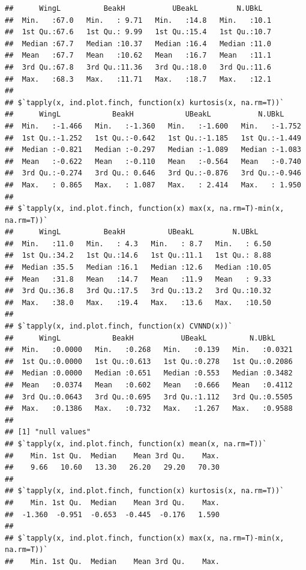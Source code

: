 \documentclass[12pt]{article}\usepackage[]{graphicx}\usepackage[]{color}
\makeatletter
\newenvironment{kframe}{%
 \def\at@end@of@kframe{}%
 \ifinner\ifhmode%
  \def\at@end@of@kframe{\end{minipage}}%
  \begin{minipage}{\columnwidth}%
 \fi\fi%
 \def\FrameCommand##1{\hskip\@totalleftmargin \hskip-\fboxsep
 \colorbox{shadecolor}{##1}\hskip-\fboxsep
     \hskip-\linewidth \hskip-\@totalleftmargin \hskip\columnwidth}%
 \MakeFramed {\advance\hsize-\width
   \@totalleftmargin\z@ \linewidth\hsize
   \@setminipage}}%
 {\par\unskip\endMakeFramed%
 \at@end@of@kframe}
\newenvironment{knitrout}{}{} %
\makeatother
\begin{document}
\begin{knitrout}
\begin{kframe}
\begin{verbatim}
##      WingL          BeakH           UBeakL         N.UBkL    
##  Min.   :67.0   Min.   : 9.71   Min.   :14.8   Min.   :10.1  
##  1st Qu.:67.6   1st Qu.: 9.99   1st Qu.:15.4   1st Qu.:10.7  
##  Median :67.7   Median :10.37   Median :16.4   Median :11.0  
##  Mean   :67.7   Mean   :10.62   Mean   :16.7   Mean   :11.1  
##  3rd Qu.:67.8   3rd Qu.:11.36   3rd Qu.:18.0   3rd Qu.:11.6  
##  Max.   :68.3   Max.   :11.71   Max.   :18.7   Max.   :12.1  
## 
## $`tapply(x, ind.plot.finch, function(x) kurtosis(x, na.rm=T))`
##      WingL            BeakH            UBeakL           N.UBkL      
##  Min.   :-1.466   Min.   :-1.360   Min.   :-1.600   Min.   :-1.752  
##  1st Qu.:-1.252   1st Qu.:-0.642   1st Qu.:-1.185   1st Qu.:-1.449  
##  Median :-0.821   Median :-0.297   Median :-1.089   Median :-1.083  
##  Mean   :-0.622   Mean   :-0.110   Mean   :-0.564   Mean   :-0.740  
##  3rd Qu.:-0.274   3rd Qu.: 0.646   3rd Qu.:-0.876   3rd Qu.:-0.946  
##  Max.   : 0.865   Max.   : 1.087   Max.   : 2.414   Max.   : 1.950  
## 
## $`tapply(x, ind.plot.finch, function(x) max(x, na.rm=T)-min(x, na.rm=T))`
##      WingL          BeakH          UBeakL         N.UBkL     
##  Min.   :11.0   Min.   : 4.3   Min.   : 8.7   Min.   : 6.50  
##  1st Qu.:34.2   1st Qu.:14.6   1st Qu.:11.1   1st Qu.: 8.88  
##  Median :35.5   Median :16.1   Median :12.6   Median :10.05  
##  Mean   :31.8   Mean   :14.7   Mean   :11.9   Mean   : 9.33  
##  3rd Qu.:36.8   3rd Qu.:17.5   3rd Qu.:13.2   3rd Qu.:10.32  
##  Max.   :38.0   Max.   :19.4   Max.   :13.6   Max.   :10.50  
## 
## $`tapply(x, ind.plot.finch, function(x) CVNND(x))`
##      WingL            BeakH           UBeakL          N.UBkL      
##  Min.   :0.0000   Min.   :0.268   Min.   :0.139   Min.   :0.0321  
##  1st Qu.:0.0000   1st Qu.:0.613   1st Qu.:0.278   1st Qu.:0.2086  
##  Median :0.0000   Median :0.651   Median :0.553   Median :0.3482  
##  Mean   :0.0374   Mean   :0.602   Mean   :0.666   Mean   :0.4112  
##  3rd Qu.:0.0643   3rd Qu.:0.695   3rd Qu.:1.112   3rd Qu.:0.5505  
##  Max.   :0.1386   Max.   :0.732   Max.   :1.267   Max.   :0.9588  
## 
## [1] "null values"
## $`tapply(x, ind.plot.finch, function(x) mean(x, na.rm=T))`
##    Min. 1st Qu.  Median    Mean 3rd Qu.    Max. 
##    9.66   10.60   13.30   26.20   29.20   70.30 
## 
## $`tapply(x, ind.plot.finch, function(x) kurtosis(x, na.rm=T))`
##    Min. 1st Qu.  Median    Mean 3rd Qu.    Max. 
##  -1.360  -0.951  -0.653  -0.445  -0.176   1.590 
## 
## $`tapply(x, ind.plot.finch, function(x) max(x, na.rm=T)-min(x, na.rm=T))`
##    Min. 1st Qu.  Median    Mean 3rd Qu.    Max. 

\end{verbatim}
\end{kframe}
\end{knitrout}
\end{document}

